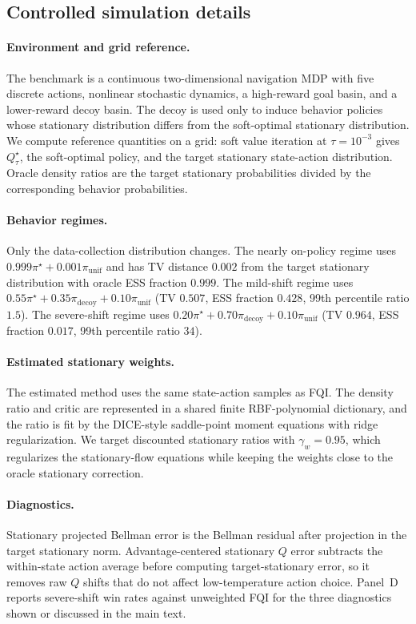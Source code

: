 \subsection{Controlled simulation details}
\label{app:soft-fqi-simulation-details}

\paragraph{Environment and grid reference.}
The benchmark is a continuous two-dimensional navigation MDP with five
discrete actions, nonlinear stochastic dynamics, a high-reward goal basin, and
a lower-reward decoy basin. The decoy is used only to induce behavior policies
whose stationary distribution differs from the soft-optimal stationary
distribution. We compute reference quantities on a grid: soft value iteration
at $\tau=10^{-3}$ gives $Q^\star_\tau$, the soft-optimal policy, and the target
stationary state-action distribution. Oracle density ratios are the target
stationary probabilities divided by the corresponding behavior probabilities.

\paragraph{Behavior regimes.}
Only the data-collection distribution changes. The nearly on-policy regime
uses $0.999\pi^\star+0.001\pi_{\mathrm{unif}}$ and has TV distance $0.002$
from the target stationary distribution with oracle ESS fraction $0.999$. The
mild-shift regime uses
$0.55\pi^\star+0.35\pi_{\mathrm{decoy}}+0.10\pi_{\mathrm{unif}}$ (TV $0.507$,
ESS fraction $0.428$, 99th percentile ratio $1.5$). The severe-shift regime
uses $0.20\pi^\star+0.70\pi_{\mathrm{decoy}}+0.10\pi_{\mathrm{unif}}$ (TV
$0.964$, ESS fraction $0.017$, 99th percentile ratio $34$).

\paragraph{Estimated stationary weights.}
The estimated method uses the same state-action samples as FQI. The density
ratio and critic are represented in a shared finite RBF-polynomial dictionary,
and the ratio is fit by the DICE-style saddle-point moment equations with
ridge regularization. We target discounted stationary ratios with
$\gamma_w=0.95$, which regularizes the stationary-flow equations while keeping
the weights close to the oracle stationary correction.

\paragraph{Diagnostics.}
Stationary projected Bellman error is the Bellman residual after projection in
the target stationary norm. Advantage-centered stationary $Q$ error subtracts
the within-state action average before computing target-stationary error, so
it removes raw $Q$ shifts that do not affect low-temperature action choice.
Panel~D reports severe-shift win rates against unweighted FQI for the three
diagnostics shown or discussed in the main text.

